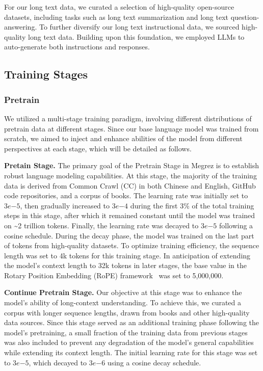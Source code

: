 For our long text data, we curated a selection of high-quality open-source datasets, including tasks such as long text summarization and long text question-answering. To further diversify our long text instructional data, we sourced high-quality long text data. 
Building upon this foundation, we employed LLMs to auto-generate both instructions and responses.

\subsection{Training Stages}

\subsubsection{Pretrain}

We utilized a multi-stage training paradigm, involving different distributions of pretrain data at different stages. Since our base language model was trained from scratch, we aimed to inject and enhance abilities of the model from different perspectives at each stage, which will be detailed as follows.

\textbf{Pretain Stage.} The primary goal of the Pretrain Stage in Megrez is to establish robust language modeling capabilities. At this stage, the majority of the training data is derived from Common Crawl (CC) in both Chinese and English, GitHub code repositories, and a corpus of books. The learning rate was initially set to \(3e{-5}\), then gradually increased to \(3e{-4}\) during the first 3\% of the total training steps in this stage, after which it remained constant until the model was trained on \textasciitilde 2 trillion tokens. Finally, the learning rate was decayed to \(3e{-5}\) following a cosine schedule. During the decay phase, the model was trained on the last part of tokens from high-quality datasets. To optimize training efficiency, the sequence length was set to 4k tokens for this training stage. In anticipation of extending the model's context length to 32k tokens in later stages, the base value in the Rotary Position Embedding (RoPE) framework~\cite{su2024roformer} was set to 5,000,000.

\textbf{Continue Pretrain Stage.} Our objective at this stage was to enhance the model's ability of long-context understanding. To achieve this, we curated a corpus with longer sequence lengths, drawn from books and other high-quality data sources. Since this stage served as an additional training phase following the model's pretraining, a small fraction of the training data from previous stages was also included to prevent any degradation of the model's general capabilities while extending its context length. The initial learning rate for this stage was set to \(3e{-5}\), which decayed to \(3e{-6}\) using a cosine decay schedule. 

